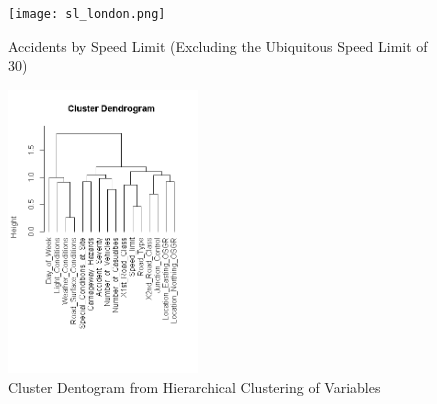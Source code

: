 \documentclass{neu_handout}
\begin{document}
\begin{figure}[!htb]
    \begin{center}
      \texttt{[image: sl\_london.png]}
      \caption{Accidents by Speed Limit (Excluding the Ubiquitous Speed Limit of 30)}
    \end{center}
\end{figure}

\begin{figure}[!htb]
    \begin{center}
      \includegraphics[height=7.5cm,keepaspectratio]{Dendrogram-of-variable-cluster.png}
      \caption{Cluster Dentogram from Hierarchical Clustering of Variables}
    \end{center}
\end{figure}
\end{document}

